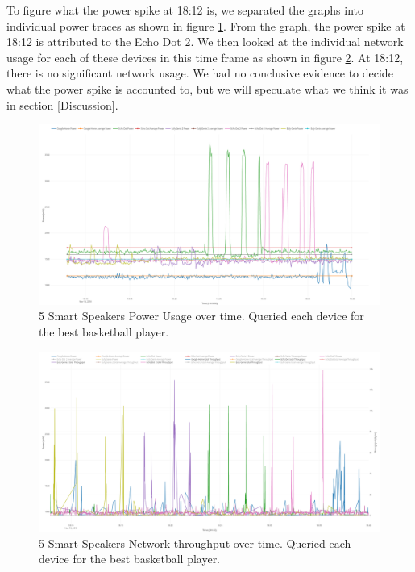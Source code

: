 To figure what the power spike at 18:12 is, we separated the graphs into individual power traces as shown in figure \ref{fig:bestBballSeperate}. From the graph, the power spike at 18:12 is attributed to the Echo Dot 2. We then looked at the individual network usage for each of these devices in this time frame as shown in figure \ref{fig:bestBballNetwork}. At 18:12, there is no significant network usage. We had no conclusive evidence to decide what the power spike is accounted to, but we will speculate what we think it was in section \ref{Discussion}.

\begin{figure}[H]
  \centering
  \includegraphics[width=1\textwidth]{figures/bestBballSeperate.png}
  \caption{5 Smart Speakers Power Usage over time. Queried each device for the
  best basketball player.}
  \label{fig:bestBballSeperate}
\end{figure}

\begin{figure}[H]
  \centering
  \includegraphics[width=1\textwidth]{figures/bestBballNetwork.png}
  \caption{5 Smart Speakers Network throughput over time. Queried each device for the best basketball player.}
  \label{fig:bestBballNetwork}
\end{figure}

